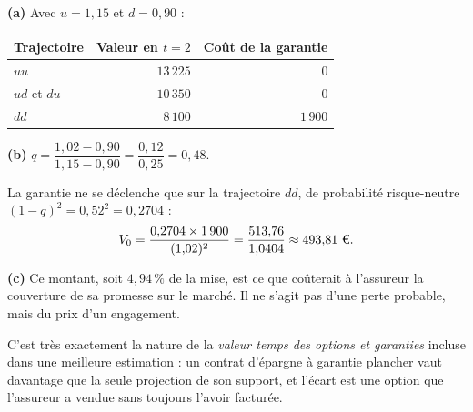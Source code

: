 \begin{corrige}
\textbf{(a)} Avec $u = 1{,}15$ et $d = 0{,}90$ :
\begin{center}\small
\begin{tabular}{lrr}
\toprule
Trajectoire & Valeur en $t=2$ & Coût de la garantie \\
\midrule
$uu$ & $13\,225$ & $0$ \\
$ud$ et $du$ & $10\,350$ & $0$ \\
$dd$ & $8\,100$ & $1\,900$ \\
\bottomrule
\end{tabular}
\end{center}

\medskip
\textbf{(b)} $q = \dfrac{1{,}02-0{,}90}{1{,}15-0{,}90} = \dfrac{0{,}12}{0{,}25} = 0{,}48$.

La garantie ne se déclenche que sur la trajectoire $dd$, de probabilité
risque-neutre $(1-q)^2 = 0{,}52^2 = 0{,}2704$ :
\[
  V_0 = \frac{0{,}2704 \times 1\,900}{(1{,}02)^{2}}
      = \frac{513{,}76}{1{,}0404} \approx 493{,}81\ \text{\euro}.
\]

\medskip
\textbf{(c)} Ce montant, soit $4{,}94\,\%$ de la mise, est ce que coûterait à
l'assureur la couverture de sa promesse sur le marché. Il ne s'agit pas d'une
perte probable, mais du prix d'un engagement.

C'est très exactement la nature de la \emph{valeur temps des options et
garanties} incluse dans une meilleure estimation : un contrat d'épargne à
garantie plancher vaut davantage que la seule projection de son support, et
l'écart est une option que l'assureur a vendue sans toujours l'avoir facturée.
\end{corrige}

